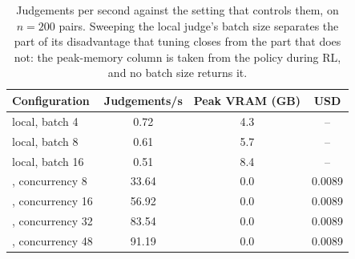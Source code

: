 \begin{table}[t]\centering\small
\caption{Judgements per second against the setting that controls them, on
$n=200$ pairs. Sweeping the local judge's batch size separates the part of
its disadvantage that tuning closes from the part that does not: the peak-memory
column is taken from the policy during RL, and no batch size returns it.}
\label{tab:throughput}
\begin{tabular}{lccc}
\toprule
Configuration & Judgements/s & Peak VRAM (GB) & USD \\
\midrule
local, batch 4 & 0.72 & 4.3 & -- \\
local, batch 8 & 0.61 & 5.7 & -- \\
local, batch 16 & 0.51 & 8.4 & -- \\
\jev{}, concurrency 8 & 33.64 & 0.0 & 0.0089 \\
\jev{}, concurrency 16 & 56.92 & 0.0 & 0.0089 \\
\jev{}, concurrency 32 & 83.54 & 0.0 & 0.0089 \\
\jev{}, concurrency 48 & 91.19 & 0.0 & 0.0089 \\
\bottomrule
\end{tabular}
\end{table}
